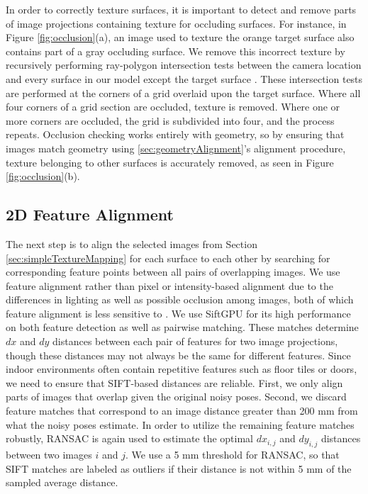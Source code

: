 \documentclass[]{spie}  %
\begin{document}
In order to correctly texture surfaces, it is important to detect and
remove parts of image projections containing texture for occluding
surfaces. For instance, in Figure \ref{fig:occlusion}(a), an image
used to texture the orange target surface also contains part of a gray
occluding surface. We remove this incorrect texture by recursively
performing ray-polygon intersection tests between the camera location
and every surface in our model except the target surface
\cite{rayintersection}. These intersection tests are performed at the
corners of a grid overlaid upon the target surface. Where all four
corners of a grid section are occluded, texture is removed. Where one
or more corners are occluded, the grid is subdivided into four, and
the process repeats. Occlusion checking works entirely with geometry,
so by ensuring that images match geometry using
\ref{sec:geometryAlignment}'s alignment procedure, texture belonging
to other surfaces is accurately removed, as seen in Figure
\ref{fig:occlusion}(b).

\subsection{2D Feature Alignment}
\label{sec:robustSIFTFeatureMatching}
The next step is to align the selected images from Section
\ref{sec:simpleTextureMapping} for each surface to each other by
searching for corresponding feature points between all pairs of
overlapping images. We use feature alignment rather than pixel or
intensity-based alignment due to the differences in lighting as well
as possible occlusion among images, both of which feature alignment is
less sensitive to \cite{lowe1999object, mikolajczyk2005performance,
  szeliski2006image}. We use SiftGPU \cite{siftgpu} for its high
performance on both feature detection as well as pairwise
matching. These matches determine $dx$ and $dy$ distances between each
pair of features for two image projections, though these distances may
not always be the same for different features. Since indoor
environments often contain repetitive features such as floor tiles or
doors, we need to ensure that SIFT-based distances are
reliable. First, we only align parts of images that overlap given the
original noisy poses. Second, we discard feature matches that
correspond to an image distance greater than 200 mm from what the
noisy poses estimate. In order to utilize the remaining feature
matches robustly, RANSAC \cite{fischler1981random} is again used to
estimate the optimal $dx_{i,j}$ and $dy_{i,j}$ distances between two
images $i$ and $j$. We use a 5 mm threshold for RANSAC, so that SIFT
matches are labeled as outliers if their distance is not within 5 mm
of the sampled average distance.
\end{document}
